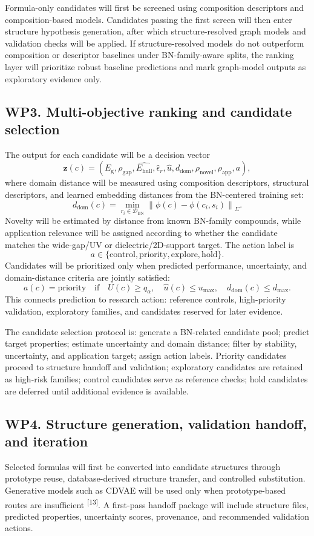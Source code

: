 \documentclass[10pt]{article}
\newcommand{\eg}{E_{\mathrm{g}}}
\newcommand{\ehull}{E_{\mathrm{hull}}}
\newcommand{\unc}{u}
\newcommand{\domain}{d_{\mathrm{dom}}}
\newcommand{\utility}{U}
\newcommand{\gapscore}{\rho_{\mathrm{gap}}}
\begin{document}
Formula-only candidates will first be screened using composition descriptors and composition-based models. Candidates passing the first screen will then enter structure hypothesis generation, after which structure-resolved graph models and validation checks will be applied.
If structure-resolved models do not outperform composition or descriptor baselines under BN-family-aware splits, the ranking layer will prioritize robust baseline predictions and mark graph-model outputs as exploratory evidence only.

\subsection*{WP3. Multi-objective ranking and candidate selection}
The output for each candidate will be a decision vector
\[
  \mathbf{z}(c)=
  (\hat{\eg},\gapscore,\hat{\ehull},\hat{\epsilon}_r,\hat{\unc},\domain,
  \rho_{\mathrm{novel}},\rho_{\mathrm{app}},a),
\]
where domain distance will be measured using composition descriptors, structural descriptors, and learned embedding distances from the BN-centered training set:
\[
  \domain(c)=\min_{r_i\in\mathcal{D}_{\mathrm{BN}}}
  \left\|\phi(c)-\phi(c_i,s_i)\right\|_{\Sigma}.
\]
Novelty will be estimated by distance from known BN-family compounds, while application relevance will be assigned according to whether the candidate matches the wide-gap/UV or dielectric/2D-support target. The action label is
\[
  a\in\{\mathrm{control},\mathrm{priority},\mathrm{explore},\mathrm{hold}\}.
\]
Candidates will be prioritized only when predicted performance, uncertainty, and domain-distance criteria are jointly satisfied:
\[
  a(c)=\mathrm{priority}\quad\mathrm{if}\quad
  \utility(c)\ge q_{\alpha},\quad \hat{\unc}(c)\le u_{\max},\quad
  \domain(c)\le d_{\max}.
\]
This connects prediction to research action: reference controls, high-priority validation, exploratory families, and candidates reserved for later evidence.

The candidate selection protocol is: generate a BN-related candidate pool; predict target properties; estimate uncertainty and domain distance; filter by stability, uncertainty, and application target; assign action labels.
Priority candidates proceed to structure handoff and validation; exploratory candidates are retained as high-risk families; control candidates serve as reference checks; hold candidates are deferred until additional evidence is available.

\subsection*{WP4. Structure generation, validation handoff, and iteration}
Selected formulas will first be converted into candidate structures through prototype reuse, database-derived structure transfer, and controlled substitution. Generative models such as CDVAE will be used only when prototype-based routes are insufficient \textsuperscript{[13]}. A first-pass handoff package will include structure files, predicted properties, uncertainty scores, provenance, and recommended validation actions.
\end{document}
